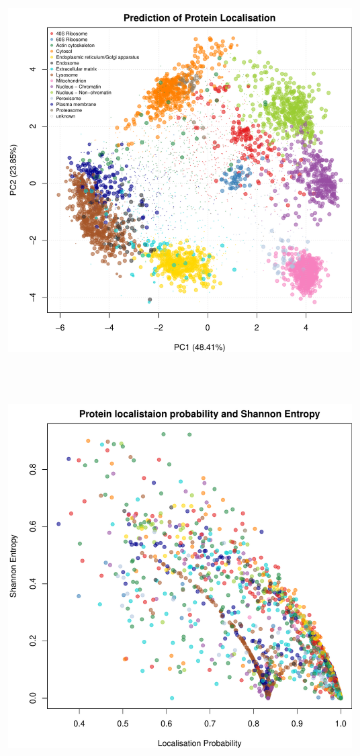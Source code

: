 \documentclass[12pt,english]{article}\usepackage[]{graphicx}\usepackage[]{color}
\makeatletter
\def\maxwidth{ %
  \ifdim\Gin@nat@width>\linewidth
    \linewidth
  \else
    \Gin@nat@width
  \fi
}
\newenvironment{knitrout}{}{} %
\makeatother
\begin{document}
\begin{figure}[p]
\begin{subfigure}[t]{0.5\textwidth}
\begin{knitrout}
{\centering \includegraphics[width=\maxwidth]{figure/pca-tagm-mcmc-1} 

}



\end{knitrout}
    \caption{}
  \end{subfigure}%
\\
  \begin{subfigure}[t]{0.5\textwidth}
    \centering
\begin{knitrout}
\color{fgcolor}

{\centering \includegraphics[width=\maxwidth]{figure/prob-vs-shannon-1} 

}
\end{knitrout}
\end{subfigure}
\end{figure}
\end{document}
